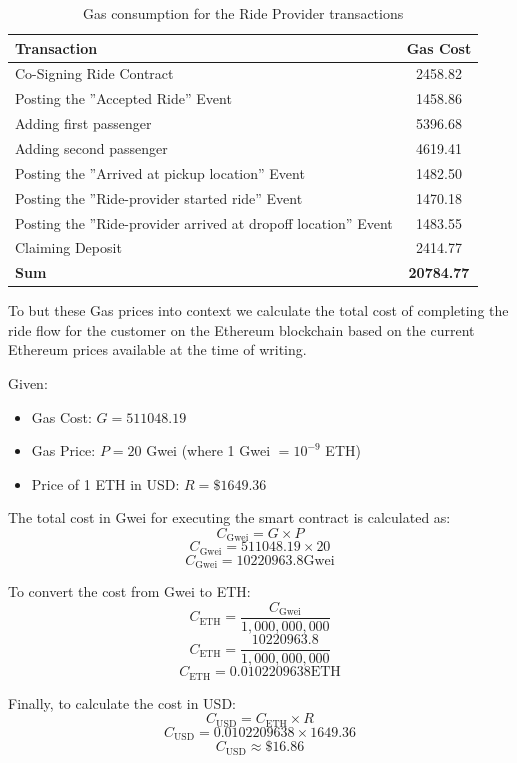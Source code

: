 \begin{table}[H]
\centering
\begin{tabular}{|l|c|}
\hline
\textbf{Transaction} & \textbf{Gas Cost} \\
\hline
Co-Signing Ride Contract & 2458.82 \\
\hline
Posting the ''Accepted Ride'' Event & 1458.86 \\
\hline
Adding first passenger  & 5396.68 \\
\hline
Adding second passenger & 4619.41 \\
\hline
Posting the ''Arrived at pickup location'' Event & 1482.50 \\
\hline
Posting the ''Ride-provider started ride'' Event & 1470.18 \\
\hline
Posting the ''Ride-provider arrived at dropoff location'' Event & 1483.55 \\
\hline
Claiming Deposit & 2414.77 \\
\hline
\hline
\textbf{Sum}  & \textbf{20784.77} \\
\hline
\end{tabular}
\caption{Gas consumption for the Ride Provider transactions}
\end{table}

To but these Gas prices into context we calculate the total cost of completing the ride flow for the customer on the Ethereum blockchain based on the current Ethereum prices available at the time of writing.

Given:
\begin{itemize}
    \item Gas Cost: \( G = 511048.19 \)
    \item Gas Price: \( P = 20 \) Gwei (where 1 Gwei \( = 10^{-9} \) ETH)
    \item Price of 1 ETH in USD: \( R = \$1649.36 \)
\end{itemize}

The total cost in Gwei for executing the smart contract is calculated as:
\[ C_{\text{Gwei}} = G \times P \]
\[ C_{\text{Gwei}} = 511048.19 \times 20 \]
\[ C_{\text{Gwei}} = 10220963.8 \text{Gwei} \]

To convert the cost from Gwei to ETH:
\[ C_{\text{ETH}} = \frac{C_{\text{Gwei}}}{1,000,000,000} \]
\[ C_{\text{ETH}} = \frac{10220963.8}{1,000,000,000} \]
\[ C_{\text{ETH}} = 0.0102209638 \text{ETH} \]

Finally, to calculate the cost in USD:
\[ C_{\text{USD}} = C_{\text{ETH}} \times R \]
\[ C_{\text{USD}} = 0.0102209638 \times 1649.36 \]
\[ C_{\text{USD}} \approx \$16.86 \]

